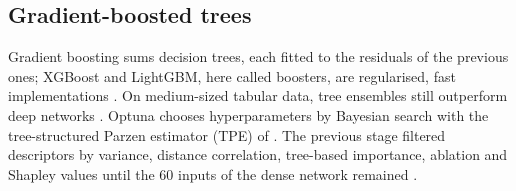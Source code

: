 \subsection{Gradient-boosted trees}
\label{sec:rev_arvores}

Gradient boosting sums decision trees, each fitted to the residuals of the previous ones; XGBoost and LightGBM, here called boosters, are regularised, fast implementations \citep{chen2016xgboost, ke2017lightgbm}. On medium-sized tabular data, tree ensembles still outperform deep networks \citep{grinsztajn2022why}. Optuna \citep{akiba2019optuna} chooses hyperparameters by Bayesian search with the tree-structured Parzen estimator (TPE) of \citet{bergstra2011algorithms}. The previous stage filtered descriptors by variance, distance correlation, tree-based importance, ablation and Shapley values until the \num{60} inputs of the dense network remained \citep{vicentin2024study}.
